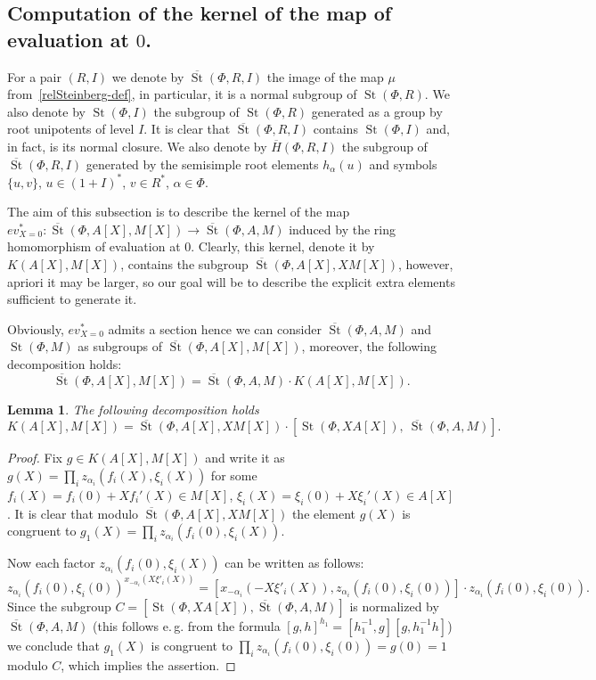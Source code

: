 \documentclass[oneside, 8pt]{amsart}
\newtheorem{lemma}{Lemma}
\theoremstyle{remark}
\theoremstyle{definition}
\DeclareMathOperator{\St}{St}
\numberwithin{equation}{section}
\begin{document}
\subsection{Computation of the kernel of the map of evaluation at $0$.}
For a pair $(R, I)$ we denote by $\overline{\St}(\Phi, R, I)$ the image of the map $\mu$ from~\eqref{relSteinberg-def}, in particular, it is a normal subgroup of $\St(\Phi, R)$.
We also denote by $\St(\Phi, I)$ the subgroup of $\St(\Phi, R)$ generated as a group by root unipotents of level $I$.
It is clear that $\overline{\St}(\Phi, R, I)$ contains $\St(\Phi, I)$ and, in fact, is its normal closure.
We also denote by $\overline{H}(\Phi, R, I)$ the subgroup of $\overline{\St}(\Phi, R, I)$ generated by the semisimple root elements $h_\alpha(u)$ and symbols $\{u, v\}$, $u \in (1+I)^*$, $v \in R^*$, $\alpha\in \Phi$.

The aim of this subsection is to describe the kernel of the map $ev_{X=0}^*\colon\overline{\St}(\Phi, A[X], M[X]) \to \overline{\St}(\Phi, A, M)$
induced by the ring homomorphism of evaluation at $0$. Clearly, this kernel, denote it by $K(A[X], M[X])$, contains the subgroup $\overline{\St}(\Phi, A[X], XM[X])$, however, apriori it may be larger, so our goal will be to describe the explicit extra elements sufficient to generate it.

Obviously, $ev_{X=0}^*$ admits a section hence we can consider $\overline{\St}(\Phi, A, M)$ and $\St(\Phi, M)$ as subgroups of $\overline{\St}(\Phi, A[X], M[X])$,
 moreover, the following decomposition holds:
\begin{equation} \label{relZero-decomp} \overline{\St}(\Phi, A[X], M[X]) = \overline{\St}(\Phi, A, M) \cdot K(A[X], M[X]).\end{equation}
\begin{lemma} 
The following decomposition holds
 \[ K(A[X], M[X]) = \overline{\St}(\Phi, A[X], XM[X]) \cdot \left[\St(\Phi, XA[X]),\ \overline{\St}(\Phi, A, M)\right].\] 
\end{lemma}
\begin{proof}
 Fix $g \in K(A[X], M[X])$ and write it as $g(X) = \prod_i z_{\alpha_i}(f_i(X), \xi_i(X))$ for some $f_i(X) = f_i(0) + Xf_i'(X) \in M[X]$, $\xi_i(X) = \xi_i(0) + X\xi_i'(X) \in A[X]$.
 It is clear that modulo $\overline{\St}(\Phi, A[X], XM[X])$ the element $g(X)$ is congruent to $g_1(X) = \prod_i z_{\alpha_i}(f_i(0), \xi_i(X)).$ 
 
 Now each factor $z_{\alpha_i}(f_i(0), \xi_i(X))$ can be written as follows:
 \[z_{\alpha_i}(f_i(0), \xi_i(0))^{x_{-\alpha_i}(X\xi'_i(X))} = [x_{-\alpha_i}(-X\xi'_i(X)), z_{\alpha_i}(f_i(0), \xi_i(0))] \cdot z_{\alpha_i}(f_i(0), \xi_i(0)).\]
 Since the subgroup $C = \left[\St(\Phi, XA[X]), \overline{\St}(\Phi, A, M)\right]$ is normalized by $\overline{\St}(\Phi, A, M)$ 
 (this follows e.\,g. from the formula $[g, h]^{h_1} = [h_1^{-1}, g][g, h_1^{-1}h]$) we conclude that $g_1(X)$ is congruent to $\prod_i z_{\alpha_i}(f_i(0), \xi_i(0)) = g(0) = 1$ modulo $C$,
 which implies the assertion. \qedhere
\end{proof}
\end{document}
